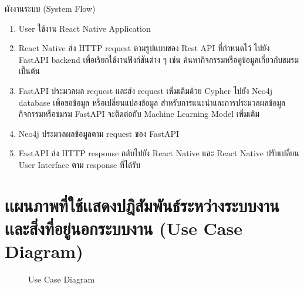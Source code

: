 \documentclass[14pt,oneside,openright,a4paper]{cpe-thai-project}
\begin{document}
ผังงานระบบ (System Flow)
\begin{enumerate}
  \item User ใช้งาน React Native Application
  \item React Native ส่ง HTTP request ตามรูปแบบของ Rest API ที่กำหนดไว้ ไปยัง FastAPI backend เพื่อเรียกใช้งานฟังก์ชันต่าง ๆ เช่น ค้นหากิจกรรมหรือดูข้อมูลเกี่ยวกับชมรม เป็นต้น
  \item FastAPI ประมวลผล request และส่ง request เพิ่มเติมด้วย Cypher ไปยัง Neo4j database เพื่อขอข้อมูล หรือเปลี่ยนแปลงข้อมูล
    สำหรับการแนะนำและการประมวลผลข้อมูลกิจกรรมหรือชมรม FastAPI จะติดต่อกับ Machine Learning Model เพิ่มเติม
  \item Neo4j ประมวลผลข้อมูลตาม request ของ FastAPI
  \item FastAPI ส่ง HTTP response กลับไปยัง React Native และ React Native ปรับเปลี่ยน User Interface ตาม response ที่ได้รับ
\end{enumerate}

\section{เเผนภาพที่ใช้เเสดงปฎิสัมพันธ์ระหว่างระบบงานเเละสิ่งที่อยู่นอกระบบงาน (Use Case Diagram)}

  \begin{figure}[!h]\centering
    \setlength{\fboxrule}{0.5mm} %
    \setlength{\fboxsep}{0.5cm}
    \caption{Use Case Diagram}\label{fig:usecasediagram}
  \end{figure}
\end{document}
